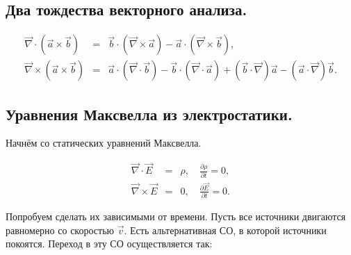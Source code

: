 \documentclass[12pt]{article}
\newcommand{\pt}{\partial}
\newcommand{\rot}{\mathrm{rot}\,}
\newcommand{\vn}{\vec{\nabla}}
\begin{document}






\subsection{Два тождества векторного анализа.}
\label{sec:vector_identities}

\begin{eqnarray}
  \label{eq:two_identities_1}
  \vn \cdot (\vec{a} \times \vec{b}) &=& \vec{b} \cdot ( \vn \times \vec{a}) -
  \vec{a} \cdot (\vn \times \vec{b}),\\
  \label{eq:two_identities_2}
\vn \times (\vec{a} \times \vec{b}) &=& \vec{a} \cdot (\vn \cdot \vec{b}) - \vec{b}
\cdot (\vn \cdot \vec{a}) + (\vec{b} \cdot \vn)\vec{a} - (\vec{a}\cdot \vn)\vec{b}.
\end{eqnarray}


\subsection{Уравнения Максвелла из электростатики.}
\label{sec:maxwell_statics}

Начнём со статических уравнений Максвелла. 

\begin{eqnarray}
  \label{eq:maxwell_statics}
  \vn \cdot \vec{E} &=& \rho, \quad \frac{\pt \rho}{\pt t}=0,\\
\vn \times \vec{E} &=& 0, \quad \frac{\pt \vec{E}}{\pt t}=0.
\end{eqnarray}

Попробуем сделать их зависимыми от времени. Пусть все источники
двигаются равномерно со скоростью $\vec{v}$. Есть альтернативная СО, в
которой источники покоятся. Переход в эту СО осуществляется так: 
\end{document}
